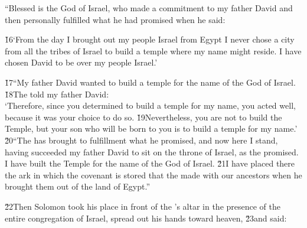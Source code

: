 \begin{poetry}
\poeml ``Blessed is the  God of Israel, who made a commitment to my father David and then personally fulfilled what he had promised when he said:
\end{poetry}

\begin{poetry}
\poeml \v{16}`From the day I brought out my people Israel from Egypt I never chose a city from all the tribes of Israel to build a temple where my name might reside. I have chosen David to be over my people Israel.'
\end{poetry}

\begin{poetry}
\poeml \v{17}``My father David wanted to build a temple for the name of the  God of Israel. \v{18}The  told my father David: \\
\poeml `Therefore, since you determined to build a temple for my name, you acted well, because it was your choice to do so. \v{19}Nevertheless, you are not to build the Temple, but your son who will be born to you is to build a temple for my name.' \\
\poeml \v{20}``The  has brought to fulfillment what he promised, and now here I stand, having succeeded my father David to sit on the throne of Israel, as the  promised. I have built the Temple for the name of the  God of Israel. \v{21}I have placed there the ark in which the covenant is stored that the  made with our ancestors when he brought them out of the land of Egypt.''
\end{poetry}

\v{22}Then Solomon took his place in front of the 's altar in the presence of the entire congregation of Israel, spread out his hands toward heaven, \v{23}and said:

